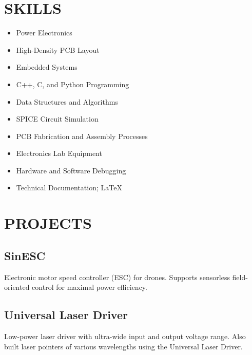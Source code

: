 

	\maketitle
	
	\section*{SKILLS}
	\begin{minipage}{0.5\textwidth}
		\centering
		\begin{itemize}
			\setlength \itemsep{0.1em}
			\item Power Electronics
			\item High-Density PCB Layout
			\item Embedded Systems
			\item C++, C, and Python Programming
			\item Data Structures and Algorithms
		\end{itemize}
	\end{minipage}%
	\begin{minipage}{0.5\textwidth}
		\centering
		\begin{itemize}
			\setlength \itemsep{0.1em}
			\item SPICE Circuit Simulation
			\item PCB Fabrication and Assembly Processes
			\item Electronics Lab Equipment
			\item Hardware and Software Debugging
			\item Technical Documentation; LaTeX
		\end{itemize}
	\end{minipage}
	
	\section*{PROJECTS}
	\subsection{SinESC}
	Electronic motor speed controller (ESC) for drones. Supports sensorless field-oriented control for maximal power efficiency.
	\subsection{Universal Laser Driver}
	Low-power laser driver with ultra-wide input and output voltage range. Also built laser pointers of various wavelengths using the Universal Laser Driver.
